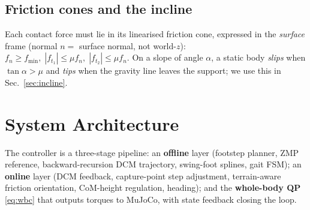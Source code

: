 \documentclass[11pt]{article}
\begin{document}
\subsection{Friction cones and the incline}
Each contact force must lie in its linearised friction cone, expressed in the
\emph{surface} frame (normal $n=$ surface normal, not world-$z$):
$f_n\ge f_{\min},\; |f_{t_1}|\le\mu f_n,\; |f_{t_2}|\le\mu f_n$. On a slope of angle
$\alpha$, a static body \emph{slips} when $\tan\alpha>\mu$ and \emph{tips} when the
gravity line leaves the support; we use this in Sec.~\ref{sec:incline}.

\section{System Architecture}
\label{sec:arch}

The controller is a three-stage pipeline: an
\textbf{offline} layer (footstep planner, ZMP reference, backward-recursion DCM
trajectory, swing-foot splines, gait FSM); an \textbf{online} layer (DCM feedback,
capture-point step adjustment, terrain-aware friction orientation, CoM-height
regulation, heading); and the \textbf{whole-body QP} \eqref{eq:wbc} that outputs
torques to MuJoCo, with state feedback closing the loop.
\end{document}
